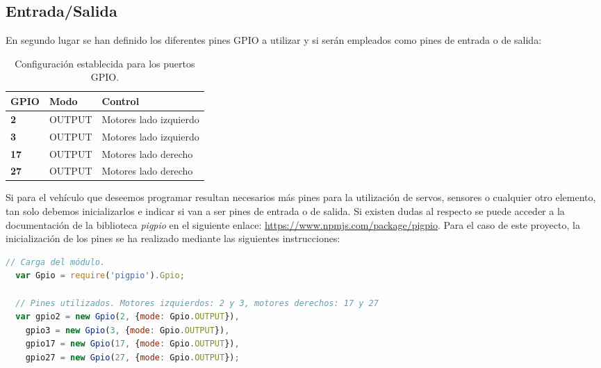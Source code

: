 \subsection{Entrada/Salida}

En segundo lugar se han definido los diferentes pines GPIO a utilizar y si serán empleados como pines de entrada o de salida:

\begin{table}[H]
  \begin{center}
    \begin{tabular}{|p{2.5cm}|p{2.5cm}|p{4.5cm}|}
      \hline
      {\textbf{GPIO}} & \textbf{ Modo } & \textbf{ Control }\\
      \hline
      {\textbf{ 2 }} & { OUTPUT } & { Motores lado izquierdo }  \\
     \hline
      {\textbf{ 3 }} & { OUTPUT } & { Motores lado izquierdo } \\
      \hline
      {\textbf{ 17 }} & { OUTPUT } & {  Motores lado derecho } \\
      \hline
      {\textbf{ 27 }} & { OUTPUT } & { Motores lado derecho } \\
     \hline   
    \end{tabular}
  \end{center}
\caption{ Configuración establecida para los puertos GPIO. }
\end{table}


Si para el vehículo que deseemos programar resultan necesarios más pines para la utilización de servos, sensores o cualquier otro elemento, tan solo debemos inicializarlos e indicar si van a ser pines de entrada
o de salida. Si existen dudas al respecto se puede acceder a la documentación de la biblioteca \emph{pigpio} en el siguiente enlace: \url{https://www.npmjs.com/package/pigpio}.
Para el caso de este proyecto, la inicialización de los pines se ha realizado mediante las siguientes instrucciones:

\begin{lstlisting}[language=JavaScript]
  // Carga del módulo.
  var Gpio = require('pigpio').Gpio;

  // Pines utilizados. Motores izquierdos: 2 y 3, motores derechos: 17 y 27
  var gpio2 = new Gpio(2, {mode: Gpio.OUTPUT}),
    gpio3 = new Gpio(3, {mode: Gpio.OUTPUT}),
    gpio17 = new Gpio(17, {mode: Gpio.OUTPUT}),
    gpio27 = new Gpio(27, {mode: Gpio.OUTPUT});
\end{lstlisting}



